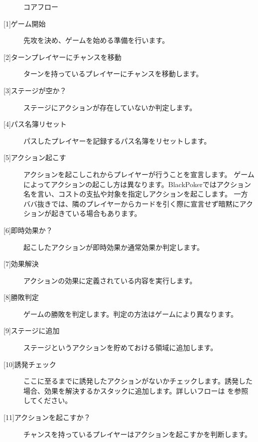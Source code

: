 \documentclass[letterpaper,10pt,dvipdfmx]{sphinxmanual}
\begin{document}
\begin{figure}[htbp]
\centering
\capstart

\noindent{}
\caption{コアフロー}\label{\detokenize{core/core:id19}}\label{\detokenize{core/core:coreflow-2}}\end{figure}
\begin{description}
\item[{{[}1{]}ゲーム開始}] \leavevmode
先攻を決め、ゲームを始める準備を行います。

\item[{{[}2{]}ターンプレイヤーにチャンスを移動}] \leavevmode
ターンを持っているプレイヤーにチャンスを移動します。

\item[{{[}3{]}ステージが空か？}] \leavevmode
ステージにアクションが存在していないか判定します。

\item[{{[}4{]}パス名簿リセット}] \leavevmode
パスしたプレイヤーを記録するパス名簿をリセットします。

\item[{{[}5{]}アクション起こす}] \leavevmode
アクションを起こしこれからプレイヤーが行うことを宣言します。
ゲームによってアクションの起こし方は異なります。BlackPokerではアクション名を言い、コストの支払や対象を指定しアクションを起こします。
一方ババ抜きでは、隣のプレイヤーからカードを引く際に宣言せず暗黙にアクションが起きている場合もあります。

\item[{{[}6{]}即時効果か？}] \leavevmode
起こしたアクションが即時効果か通常効果か判定します。

\item[{{[}7{]}効果解決}] \leavevmode
アクションの効果に定義されている内容を実行します。

\item[{{[}8{]}勝敗判定}] \leavevmode
ゲームの勝敗を判定します。判定の方法はゲームにより異なります。

\item[{{[}9{]}ステージに追加}] \leavevmode
ステージというアクションを貯めておける領域に追加します。

\item[{{[}10{]}誘発チェック}] \leavevmode
ここに至るまでに誘発したアクションがないかチェックします。誘発した場合、効果を解決するかスタックに追加します。詳しいフローは  を参照してください。

\item[{{[}11{]}アクションを起こすか？}] \leavevmode
チャンスを持っているプレイヤーはアクションを起こすかを判断します。


\end{description}
\end{document}
